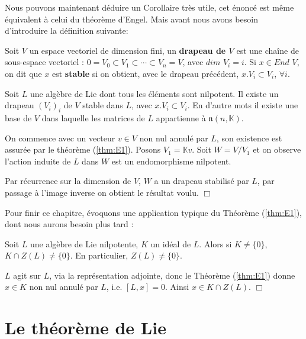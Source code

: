\documentclass[a4paper,openany,12pt]{report}
\newcommand{\KK}{\mathbb{K}}
\newcommand{\nn}{\mathfrak{n}}
\theoremstyle{break}
{\theorembodyfont{\upshape}
\newtheorem*{rmq}{Remarque :}
\newtheorem*{prv}{Preuve :}
\newtheorem*{ex}{Exemples :}
\newtheorem*{exe}{Exemple : }
\newtheorem*{nota}{Notation :}
\newtheorem*{dem}{D\'emonstration :}}
\begin{document}
Nous pouvons maintenant déduire un Corollaire très utile, cet énoncé est même équivalent à celui du théorème d'Engel. Mais avant nous avons besoin d'introduire la définition suivante:

\begin{df}
\quad Soit $V$ un espace vectoriel de dimension fini, un \textbf{drapeau de $V$} est une chaîne de sous-espace vectoriel : $0 = V_{0} \subset V_{1} \subset \cdots \subset V_{n} = V$, avec $dim$ $V_{i} = i$.
Si $x \in End$ $V$, on dit que $x$ est \textbf{stable} si on obtient, avec le drapeau précédent, $x.V_{i} \subset V_{i}$, $\forall i$.
\end{df}

\begin{cor}\label{cor:E1}
\quad Soit $L$ une algèbre de Lie dont tous les éléments sont nilpotent. Il existe un drapeau $(V_{i})_{i}$ de $V$ stable dans $L$, avec $x.V_{i} \subset V_{i}$. En d'autre mots il existe une base de $V$ dans laquelle les matrices de $L$ appartienne à $\nn(n,\KK)$.
\end{cor}

\begin{prv}
\quad On commence avec un vecteur $v \in V$ non nul annulé par $L$, son existence est assurée par le théorème (\ref{thm:E1}). Posons $V_{1} = \KK v$. Soit $W= V/V_{1}$ et on observe l'action induite de $L$ dans $W$ est un endomorphisme nilpotent.

Par récurrence sur la dimension de $V$, $W$ a un drapeau stabilisé par $L$, par passage à l'image inverse on obtient le résultat voulu. $\Box$
\end{prv}

Pour finir ce chapitre, évoquons une application  typique du Théorème (\ref{thm:E1}), dont nous aurons besoin plus tard : 

\begin{lem}\label{lem:E2}
\quad Soit $L$ une algèbre de Lie nilpotente, $K$ un idéal de $L$. Alors si $K \neq \{0\}$, $K \cap Z(L) \neq \{ 0 \}$.
En particulier, $Z(L) \neq \{ 0 \}$.
\end{lem}

\begin{prv}
\quad $L$ agit sur $L$, via la représentation adjointe, donc le Théorème (\ref{thm:E1}) donne $x \in K$ non nul annulé par $L$, i.e. $[L,x]=0$. Ainsi $x \in K \cap Z(L)$. $\Box$
\end{prv}

\chapter{Le théorème de Lie}
\end{document}
